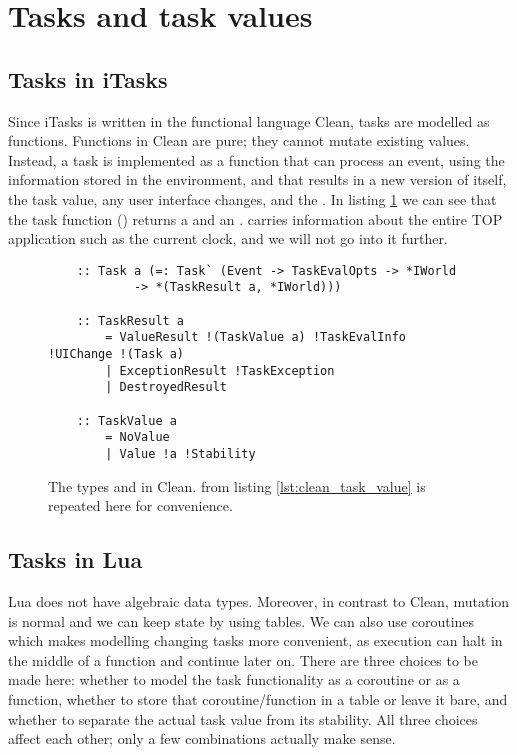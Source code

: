 \section{Tasks and task values}\label{section-task-values}

\subsection{Tasks in iTasks}
Since iTasks is written in the functional language Clean, tasks are modelled as functions. Functions in Clean are pure; they cannot mutate existing values. Instead, a task is implemented as a function that can process an event, using the information stored in the  environment, and that results in a new version of itself, the task value, any user interface changes, and the .
In listing \ref{lst:clean_task_taskresult_types} we can see that the task function () returns a  and an .  carries information about the entire TOP application such as the current clock, and we will not go into it further.

\begin{figure}[ht]
    \centering
    \begin{verbatim}
    :: Task a (=: Task` (Event -> TaskEvalOpts -> *IWorld
            -> *(TaskResult a, *IWorld)))
    
    :: TaskResult a
        = ValueResult !(TaskValue a) !TaskEvalInfo !UIChange !(Task a)
        | ExceptionResult !TaskException
        | DestroyedResult
    
    :: TaskValue a
        = NoValue
        | Value !a !Stability
    \end{verbatim}
    \caption{The types  and  in Clean.  from listing \ref{lst:clean_task_value} is repeated here for convenience.}
    \label{lst:clean_task_taskresult_types}
\end{figure}

\subsection{Tasks in Lua}
Lua does not have algebraic data types. Moreover, in contrast to Clean, mutation is normal and we can keep state by using tables. We can also use coroutines which makes modelling changing tasks more convenient, as execution can halt in the middle of a function and continue later on. There are three choices to be made here: whether to model the task functionality as a coroutine or as a function, whether to store that coroutine/function in a table or leave it bare, and whether to separate the actual task value from its stability. All three choices affect each other; only a few combinations actually make sense.

